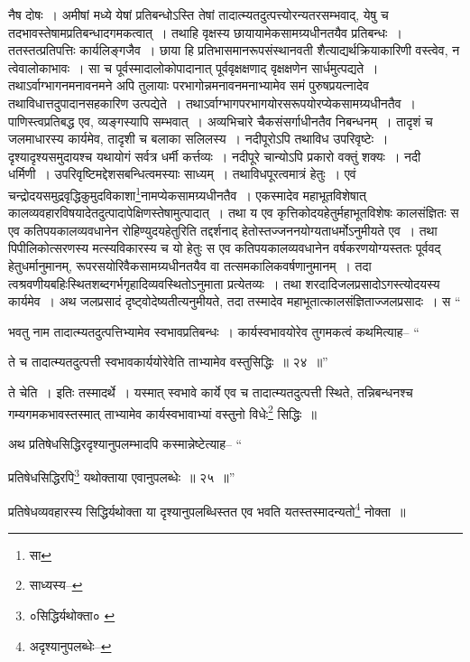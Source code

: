 \documentclass[article,12pt,a4paper]{memoir}
\begin{document}
	  \pstart नैष दोषः । अमीषां मध्ये येषां प्रतिबन्धोऽस्ति तेषां तादात्म्यतदुत्पत्त्योरन्यतरसम्भवाद्, येषु च तदभावस्तेषामप्रतिबन्धादगमकत्वात् । तथाहि वृक्षस्य छायायामेकसामग्र्यधीनतयैव प्रतिबन्धः । ततस्तत्प्रतिपत्तिः कार्यलिङ्गजैव । छाया हि प्रतिभासमानरूपसंस्थानवती शैत्याद्यर्थक्रियाकारिणी वस्त्वेव, न त्वेवालोकाभावः । सा च पूर्वस्मादालोकोपादानात् पूर्ववृक्षक्षणाद् वृक्षक्षणेन सार्धमुत्पद्यते । तथाऽर्वाग्भागनमनावनमने अपि तुलायाः परभागोन्नमनावनमनाभ्यामेव समं पुरुषप्रयत्नादेव तथाविधात्तदुपादानसह\leavevmode{}कारिण उत्पद्येते । तथाऽर्वाग्भागपरभागयोरसरूपयोरप्येकसामग्र्यधीनतैव । पाणिस्त्वप्रतिबद्ध एव, व्यङ्गस्यापि सम्भवात् । अव्यभिचारे चैकसंसर्गाधीनतैव निबन्धनम् । तादृशं च जलमाधारस्य कार्यमेव, तादृशी च बलाका सलिलस्य । नदीपूरोऽपि तथाविध उपरिवृष्टेः । दृश्यादृश्यसमुदायश्च यथायोगं सर्वत्र धर्मी कर्त्तव्यः । नदीपूरे चान्योऽपि प्रकारो वक्तुं शक्यः । नदी धर्मिणी । उपरिवृष्टिमद्देशसबन्धित्वमस्याः साध्यम् । तथाविधपूरत्वमात्रं हेतुः । एवं चन्द्रोदयसमुद्रवृद्धिकुमुदविकाशा\footnote{सा}नामप्येकसामग्र्यधीनतैव । एकस्मादेव महाभूतविशेषात् कालव्यवहारविषयादेतदुत्पादापेक्षिणस्तेषामुत्पादात् । तथा य एव कृत्तिकोदयहेतुर्महाभूतविशेषः कालसंज्ञितः स एव कतिपयकालव्यवधानेन रोहिण्युदयहेतुरिति तद्दर्शनाद् हेतोस्तज्जननयोग्यताधर्मोऽनुमीयते एव । तथा पिपीलिकोत्सरणस्य मत्स्यविकारस्य च यो हेतुः स एव कतिपयकालव्यवधानेन वर्षकरणयोग्यस्ततः पूर्ववद् हेतुधर्मानुमानम्, रूपरसयोरिवैकसामग्र्यधीनतयैव वा तत्समकालिकवर्षणानुमानम् । तदा त्वश्रवणीयबहिःस्थितशब्दगर्भगृहादिव्यवस्थितोऽनुमाता प्रत्येतव्यः । तथा शरदादिजलप्रसादोऽगस्त्योदयस्य कार्यमेव । अथ जलप्रसादं दृष्ट्वोदेष्यतीत्यनुमीयते, तदा तस्मादेव महाभूतात्कालसंज्ञिताज्जलप्रसादः । स \leavevmode{} “
	  
	भवतु नाम तादात्म्यतदुत्पत्तिभ्यामेव स्वभावप्रतिबन्धः । कार्यस्वभावयोरेव तुगमकत्वं कथमित्याह-- “
	  
	ते च तादात्म्यतदुत्पत्ती स्वभावकार्ययोरेवेति ताभ्यामेव वस्तुसिद्धिः ॥ २४ ॥” 
	  
	ते चेति । इतिः तस्मादर्थे । यस्मात् स्वभावे कार्ये एव च तादात्म्यतदुत्पत्ती स्थिते, तन्निबन्धनश्च गम्यगमकभावस्तस्मात् ताभ्यामेव कार्यस्वभावाभ्यां वस्तुनो विधेः\footnote{साध्यस्य--\cite{dp-msD-n}} सिद्धिः ॥ 
	  
	अथ प्रतिषेधसिद्धिरदृश्यानुपलम्भादपि कस्मान्नेष्टेत्याह-- “
	  
	प्रतिषेधसिद्धिरपि\footnote{०सिद्धिर्यथोक्ता० \cite{dp-edE}} यथोक्ताया एवानुपलब्धेः ॥ २५ ॥” 
	  
	प्रतिषेधव्यवहारस्य सिद्धिर्यथोक्ता या दृश्यानुपलब्धिस्तत एव भवति यतस्तस्मादन्यतो\footnote{अदृश्यानुपलब्धेः--\cite{dp-msD-n}} नोक्ता ॥ 
	  
\end{document}
